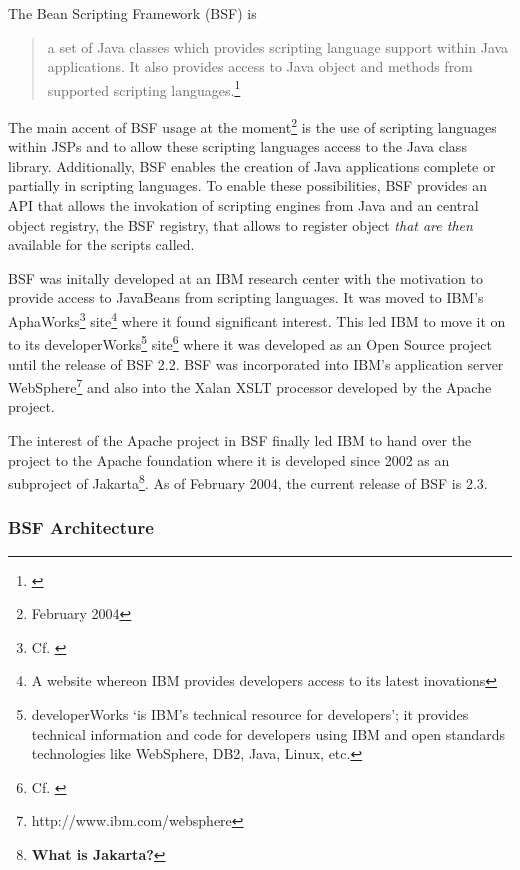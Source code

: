 The Bean Scripting Framework (BSF) is

\begin{quotation}
	a set of Java classes which provides scripting language support within Java applications. It also provides access to Java object and methods from supported scripting languages.\footnote{\cite{BsfFaq}}
\end{quotation}

The main accent of BSF usage at the moment\footnote{February 2004} is the use of scripting languages within JSPs and to allow these scripting languages access to the Java class library. Additionally, BSF enables the creation of Java applications complete or partially in scripting languages. To enable these possibilities, BSF provides an API that allows the invokation of scripting engines from Java and an central object registry, the BSF registry, that allows to register object \emph{that are then} available for the scripts called.

BSF was initally developed at an IBM research center with the motivation to provide access to JavaBeans from scripting languages. It was moved to IBM's AphaWorks\footnote{Cf. \cite{IbmAlpha}} site\footnote{A website whereon IBM provides developers access to its latest inovations} where it found significant interest. This led IBM to move it on to its developerWorks\footnote{developerWorks `is IBM's technical resource for developers'\cite{IbmDevelAbout}; it provides technical information and code for developers using IBM and open standards technologies like WebSphere, DB2, Java, Linux, etc.}  site\footnote{Cf. \cite{IbmDevel}} where it was developed as an Open Source project until the release of BSF 2.2. BSF was incorporated into IBM's application server WebSphere\footnote{http://www.ibm.com/websphere} and also into the Xalan XSLT processor developed by the Apache project.

The interest of the Apache project in BSF finally led IBM to hand over the project to the Apache foundation where it is developed since 2002 as an subproject of Jakarta\footnote{\textbf{What is Jakarta?}}. As of February 2004, the current release of BSF is 2.3.

\subsubsection{BSF Architecture}

